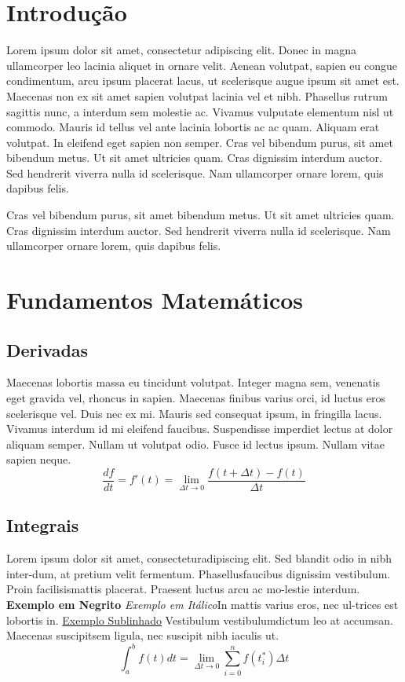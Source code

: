 \documentclass[11pt, a4paper]{article}
\begin{document}
    \begin{multicols}{2}
    \section{Introdução}
    Lorem ipsum dolor sit amet, consectetur adipiscing elit. Donec in magna ullamcorper leo lacinia aliquet in ornare velit. Aenean volutpat, sapien eu congue condimentum, arcu ipsum placerat lacus, ut scelerisque augue ipsum sit amet est. Maecenas non ex sit amet sapien volutpat lacinia vel et nibh. Phasellus rutrum sagittis nunc, a interdum sem molestie ac. Vivamus vulputate elementum nisl ut commodo. Mauris id tellus vel ante lacinia lobortis ac ac quam. Aliquam erat volutpat. In eleifend eget sapien non semper. Cras vel bibendum purus, sit amet bibendum metus. Ut sit amet ultricies quam. Cras dignissim interdum auctor. Sed hendrerit viverra nulla id scelerisque. Nam ullamcorper ornare lorem, quis dapibus felis. \cite{Moyses1}
    
    Cras vel bibendum purus, sit amet bibendum metus. Ut sit amet ultricies quam. Cras dignissim interdum auctor. Sed hendrerit viverra nulla id scelerisque. Nam ullamcorper ornare lorem, quis dapibus felis. 
    
    \section{Fundamentos Matemáticos}
    \subsection{Derivadas}
    Maecenas lobortis massa eu tincidunt volutpat. Integer magna sem, venenatis eget gravida vel, rhoncus in sapien. Maecenas finibus varius orci, id luctus eros scelerisque vel. Duis nec ex mi. Mauris sed consequat ipsum, in fringilla lacus. Vivamus interdum id mi eleifend faucibus. Suspendisse imperdiet lectus at dolor aliquam semper. Nullam ut volutpat odio. Fusce id lectus ipsum. Nullam vitae sapien neque.
    $$\frac{df}{dt} = f'(t) = \lim_{\Delta t \to 0} \frac{f(t+\Delta t) - f(t)}{\Delta t}$$
    
    \subsection{Integrais}
    Lorem ipsum dolor sit amet, consecteturadipiscing elit. Sed blandit odio in nibh inter-dum, at pretium velit fermentum.  Phasellusfaucibus dignissim vestibulum.  Proin facilisismattis placerat.  Praesent luctus arcu ac mo-lestie interdum.  \textbf{Exemplo em Negrito} \textit{Exemplo em Itálico}In mattis varius eros, nec ul-trices est lobortis in. \underline{Exemplo Sublinhado} Vestibulum vestibulumdictum  leo  at  accumsan.   Maecenas suscipitsem ligula, nec suscipit nibh iaculis ut.
    $$\int_{a}^{b} f(t) dt = \lim_{\Delta t \to 0} \sum_{i=0}^{n} f(t_{i}^{*}) \Delta t$$
    

\end{multicols}
\end{document}
